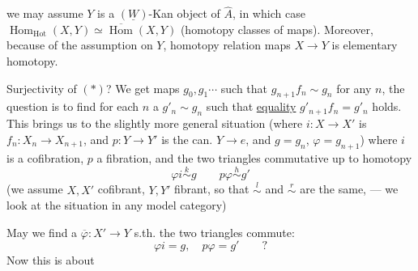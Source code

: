 we may assume $Y$ is a $(\underline W)$-Kan object of $\widehat A$, in which case $\operatorname{Hom}_{\mathrm{Hot}}(X,Y)\simeq\overline{\operatorname{Hom}}(X,Y)$ (homotopy classes of maps). Moreover, because of the assumption on $Y$,  homotopy relation  maps $X\longrightarrow Y$ is   elementary homotopy.

Surjectivity of $(*)$? We get maps $g_0,g_1\cdots$
such that $g_{n+1}f_n\sim g_n$ for any $n$, the question is to find  for each $n$ a $g'_n\sim g_n$ such that \uline{equality} $g'_{n+1}f_n=g'_n$ holds. This brings us to the slightly more general situation (where $i:X\longrightarrow X'$ is $f_n:X_n\longrightarrow X_{n+1}$, and $p:Y\longrightarrow Y'$ is the can. $Y\longrightarrow e$, and $g=g_n$, $\varphi=g_{n+1}$)
where $i$ is a cofibration, $p$  a fibration, and the two triangles commutative up to homotopy
\[\varphi i\overset k\sim g\qquad p\varphi\overset h\sim g'\]
(we assume $X,X'$ cofibrant, $Y,Y'$ fibrant, so that $\overset l\sim$ and $\overset r\sim$ are the same, --- we look at the situation in any model category)

May we find a $\overline\varphi:X'\longrightarrow Y$  s.th. the two triangles commute:
\[\varphi i=g,\quad p\varphi=g'\qquad?\]
\margin{$\overline\varphi\sim\varphi$,}
Now this is about


